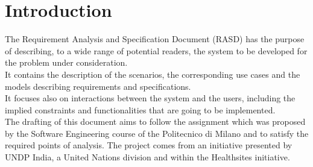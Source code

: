 \chapter{Introduction}

The Requirement Analysis and Specification Document (RASD) has the purpose of describing, to a wide range of potential readers, the system to be developed for the problem under consideration.\\ 
It contains the description of the scenarios, the corresponding use cases and the models describing requirements and specifications.\\
It focuses also on interactions between the system and the users, including the implied  constraints and functionalities that are going to be implemented.\\

The drafting of this document aims to follow the assignment which was proposed by the Software Engineering course of the Politecnico di Milano and to satisfy the required points of analysis. 
The project comes from an initiative presented by UNDP India, a United Nations division and within the Healthsites initiative.






